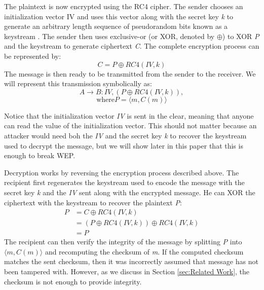 \documentclass[11pt, twocolumn]{article} %
\begin{document}
The plaintext is now encrypted using the RC4 cipher.  The sender chooses an initialization vector IV and uses this vector along with the secret key \textit{k} to generate an arbitrary length sequence of pseudorandom bits known as a keystream \cite{spore}.  The sender then uses exclusive-or (or XOR, denoted by $\oplus$) to XOR \textit{P} and the keystream to generate ciphertext \textit{C}.  The complete encryption process can be represented by: 
$$C = P \oplus RC4(IV, k)$$
The message is then ready to be transmitted from the sender to the receiver.  We will represent this transmission symbolically as:
$$A \rightarrow B: IV, (P \oplus RC4(IV, k)),$$
$$ \text{where} P = \langle m, C(m) \rangle$$ 

Notice that the initialization vector \textit{IV} is sent in the clear, meaning that anyone can read the value of the initialization vector.  This should not matter because an attacker would need boh the \textit{IV} and the secret key \textit{k} to recover the keystream used to decrypt the message, but we will show later in this paper that this is enough to break WEP.

Decryption works by reversing the encryption process described above.  The recipient first regenerates the keystream used to encode the message with the secret key \textit{k} and the \textit{IV} sent along with the encrypted message.  He can XOR the ciphertext with the keystream to recover the plaintext \textit{P}:
\begin{align*}
P &= C \oplus RC4(IV, k)\\
\nonumber &= (P \oplus RC4(IV, k)) \oplus RC4(IV, k)\\
\nonumber &= P
\end{align*}
The recipient can then verify the integrity of the message by splitting \textit{P} into $\langle m, C(m) \rangle$ and recomputing the checksum of \textit{m}.  If the computed checksum matches the sent checksum, then it was incorrectly assumed that message has not been tampered with.   However, as we discuss in Section \ref{sec:Related Work}, the checksum is not enough to provide integrity. 
\end{document}
